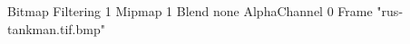 {Bitmap
	{Filtering 1}
	{Mipmap 1}
	{Blend none}
	{AlphaChannel 0}
	{Frame "rus-tankman.tif.bmp"}
}
